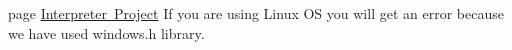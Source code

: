 
\begin{DoxyRefList}
\item[page \mbox{\hyperlink{index}{Interpreter Project}} ]\label{bug__bug000001}%
%
If you are using Linux OS you will get an error because we have used windows.\+h library. 
\end{DoxyRefList}
